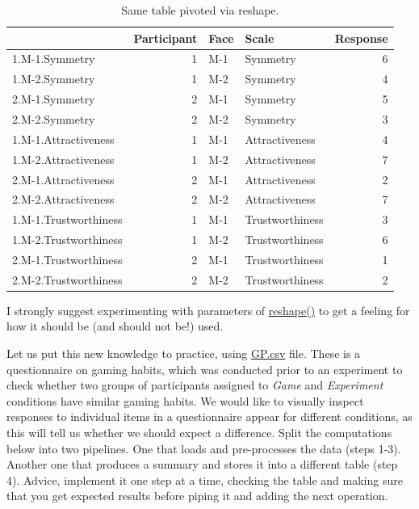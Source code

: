 \documentclass[
]{book}
\begin{document}
\begin{table}

\caption{\label{tab:unnamed-chunk-204}Same table pivoted via reshape.}
\centering
\begin{tabular}[t]{l|r|l|l|r}
\hline
  & Participant & Face & Scale & Response\\
\hline
1.M-1.Symmetry & 1 & M-1 & Symmetry & 6\\
\hline
1.M-2.Symmetry & 1 & M-2 & Symmetry & 4\\
\hline
2.M-1.Symmetry & 2 & M-1 & Symmetry & 5\\
\hline
2.M-2.Symmetry & 2 & M-2 & Symmetry & 3\\
\hline
1.M-1.Attractiveness & 1 & M-1 & Attractiveness & 4\\
\hline
1.M-2.Attractiveness & 1 & M-2 & Attractiveness & 7\\
\hline
2.M-1.Attractiveness & 2 & M-1 & Attractiveness & 2\\
\hline
2.M-2.Attractiveness & 2 & M-2 & Attractiveness & 7\\
\hline
1.M-1.Trustworthiness & 1 & M-1 & Trustworthiness & 3\\
\hline
1.M-2.Trustworthiness & 1 & M-2 & Trustworthiness & 6\\
\hline
2.M-1.Trustworthiness & 2 & M-1 & Trustworthiness & 1\\
\hline
2.M-2.Trustworthiness & 2 & M-2 & Trustworthiness & 2\\
\hline
\end{tabular}
\end{table}

I strongly suggest experimenting with parameters of \href{https://stat.ethz.ch/R-manual/R-patched/library/stats/html/reshape.html}{reshape()} to get a feeling for how it should be (and should not be!) used.

Let us put this new knowledge to practice, using \href{data/GP.csv}{GP.csv} file. These is a questionnaire on gaming habits, which was conducted prior to an experiment to check whether two groups of participants assigned to \emph{Game} and \emph{Experiment} conditions have similar gaming habits. We would like to visually inspect responses to individual items in a questionnaire appear for different conditions, as this will tell us whether we should expect a difference. Split the computations below into two pipelines. One that loads and pre-processes the data (steps 1-3). Another one that produces a summary and stores it into a different table (step 4). Advice, implement it one step at a time, checking the table and making sure that you get expected results before piping it and adding the next operation.
\end{document}
